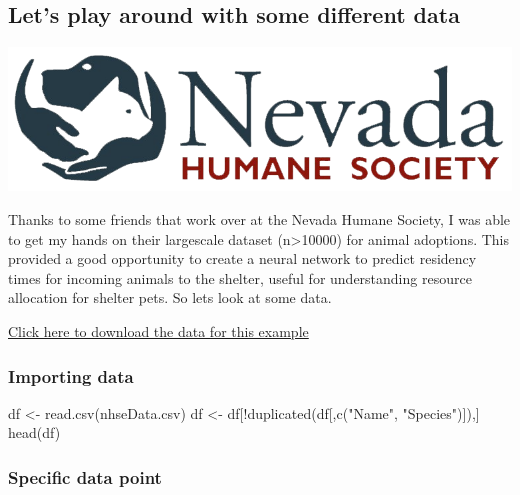 \documentclass[
]{article}
\newenvironment{Shaded}{\begin{snugshade}}{\end{snugshade}}
\newcommand{\FunctionTok}[1]{\textcolor[rgb]{0.00,0.00,0.00}{#1}}
\newcommand{\NormalTok}[1]{#1}
\newcommand{\OtherTok}[1]{\textcolor[rgb]{0.56,0.35,0.01}{#1}}
\newcommand{\SpecialCharTok}[1]{\textcolor[rgb]{0.00,0.00,0.00}{#1}}
\newcommand{\StringTok}[1]{\textcolor[rgb]{0.31,0.60,0.02}{#1}}
\begin{document}
\hypertarget{lets-play-around-with-some-different-data}{%
\subsection{Let's play around with some different
data}\label{lets-play-around-with-some-different-data}}

\includegraphics{media/Nevada-Humane-Society-Logo.png}

Thanks to some friends that work over at the Nevada Humane Society, I
was able to get my hands on their largescale dataset
(n\textgreater10000) for animal adoptions. This provided a good
opportunity to create a neural network to predict residency times for
incoming animals to the shelter, useful for understanding resource
allocation for shelter pets. So lets look at some data.

\href{nhseData.csv}{Click here to download the data for this example}

\hypertarget{importing-data}{%
\subsubsection{Importing data}\label{importing-data}}

\begin{Shaded}
\begin{Highlighting}[]
\NormalTok{df }\OtherTok{\textless{}{-}} \FunctionTok{read.csv}\NormalTok{(}\StringTok{\textquotesingle{}nhseData.csv\textquotesingle{}}\NormalTok{)}
\NormalTok{df }\OtherTok{\textless{}{-}}\NormalTok{ df[}\SpecialCharTok{!}\FunctionTok{duplicated}\NormalTok{(df[,}\FunctionTok{c}\NormalTok{(}\StringTok{"Name"}\NormalTok{, }\StringTok{"Species"}\NormalTok{)]),] }
\FunctionTok{head}\NormalTok{(df)}
\end{Highlighting}
\end{Shaded}

\hypertarget{specific-data-point}{%
\subsubsection{Specific data point}\label{specific-data-point}}
\end{document}
